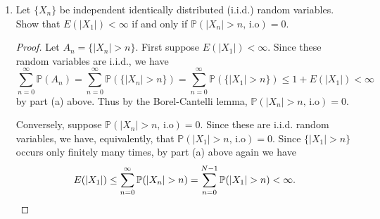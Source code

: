 \documentclass[11pt,oneside,english]{amsart}
\DeclarePairedDelimiter{\ceil}{\lceil}{\rceil}
\theoremstyle{definition}
\newcommand{\1}{\mathbbm{1}}
\newcommand{\p}{\mathbb{P}}
\begin{document}
\begin{enumerate}[leftmargin=*]
\begin{enumerate}
\begin{proof}
Moreover, since $1+|X|\geq \ceil{|X|}$,
\[
\sum_{n=0}^\infty \p(|X|>  n)= \int_\Omega\ceil{|X|}\,d\p\leq\int_\Omega1+|X|\,d\p=1+\int_\Omega |X|\,d\p=1+E(|X|),
\]

and we have
\[
E(|X|)\leq \sum_{n=0}^\infty \p(|X|> n)\leq 1+E(|X|).\qedhere
\]
\end{proof}


\item Let $\{X_n\}$ be independent identically distributed (i.i.d.) random variables. Show that $E(|X_1|)<\infty$ if and only if $\p(|X_n|>n,\,\text{i.o})=0$.

\begin{proof}
Let $A_n=\{|X_n|>n\}$. First suppose $E(|X_1|)<\infty$. Since these random variables are i.i.d., we have
\[
\sum_{n=0}^\infty\p(A_n)=\sum_{n=0}^\infty\p(\{|X_n|>n\})=\sum_{n=0}^\infty\p(\{|X_1|>n\})\leq 1+E(|X_1|)<\infty
\]
by part (a) above. Thus by the Borel-Cantelli lemma, $\p(|X_n|>n,\,\text{i.o})=0$.

Conversely, suppose $\p(|X_n|>n,\,\text{i.o})=0$. Since these are i.i.d. random variables, we have, equivalently, that $\p(|X_1|>n,\,\text{i.o})=0$. Since $\{|X_1|>n\}$ occurs only finitely many times, by part (a) above again we have
\[
E(|X_1|)\leq \sum_{n=0}^\infty\p(|X_n|>n)=\sum_{n=0}^{N-1}\p(|X_1|>n)<\infty.\qedhere
\]
\end{proof}

\end{enumerate}


\end{enumerate}
\end{document}

